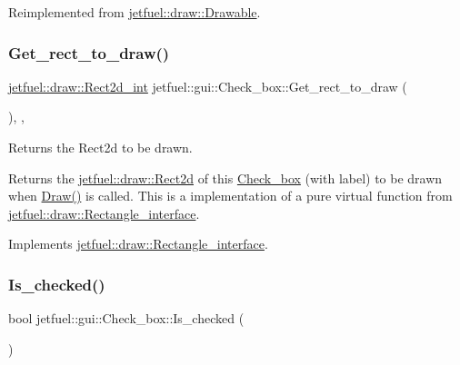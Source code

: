 Reimplemented from \hyperlink{classjetfuel_1_1draw_1_1Drawable_ae7ebd30d66db2c8a5d5371cbcf0023fc}{jetfuel\+::draw\+::\+Drawable}.

\mbox{\label{classjetfuel_1_1gui_1_1Check__box_a09feae5781a788df462be6276e2d1c54}} 
\subsubsection{\texorpdfstring{Get\+\_\+rect\+\_\+to\+\_\+draw()}{Get\_rect\_to\_draw()}}
{\footnotesize\ttfamily \hyperlink{classjetfuel_1_1draw_1_1Rect2d}{jetfuel\+::draw\+::\+Rect2d\+\_\+int} jetfuel\+::gui\+::\+Check\+\_\+box\+::\+Get\+\_\+rect\+\_\+to\+\_\+draw (\begin{DoxyParamCaption}{ }\end{DoxyParamCaption})\hspace{0.3cm}{\ttfamily [inline]}, {\ttfamily [override]}, {\ttfamily [virtual]}}



Returns the Rect2d to be drawn. 

Returns the \hyperlink{classjetfuel_1_1draw_1_1Rect2d}{jetfuel\+::draw\+::\+Rect2d} of this \hyperlink{classjetfuel_1_1gui_1_1Check__box}{Check\+\_\+box} (with label) to be drawn when \hyperlink{classjetfuel_1_1gui_1_1Check__box_ad2ce6d4af8d950a4ef76b0688541c29a}{Draw()} is called. This is a implementation of a pure virtual function from \hyperlink{classjetfuel_1_1draw_1_1Rectangle__interface}{jetfuel\+::draw\+::\+Rectangle\+\_\+interface}. 

Implements \hyperlink{classjetfuel_1_1draw_1_1Rectangle__interface_a03fd3b6842ab7b3065379caec407296f}{jetfuel\+::draw\+::\+Rectangle\+\_\+interface}.

\mbox{\label{classjetfuel_1_1gui_1_1Check__box_a906b159264ffa88cab5d9d467331f229}} 
\subsubsection{\texorpdfstring{Is\+\_\+checked()}{Is\_checked()}}
{\footnotesize\ttfamily bool jetfuel\+::gui\+::\+Check\+\_\+box\+::\+Is\+\_\+checked (\begin{DoxyParamCaption}{ }\end{DoxyParamCaption})\hspace{0.3cm}{\ttfamily [inline]}}



